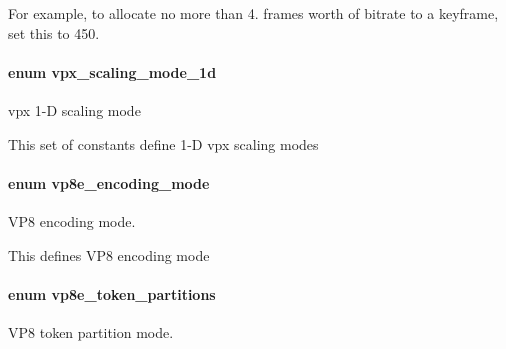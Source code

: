 \begin{Desc}
\begin{description}
\-For example, to allocate no more than 4. frames worth of bitrate to a keyframe, set this to 450. \end{description}
\end{Desc}

\hypertarget{group__vp8__encoder_ga70071b1bb6cac9a1ef0ea3d8362ff94f}{
\paragraph[{vpx\-\_\-scaling\-\_\-mode\-\_\-1d}]{\setlength{\rightskip}{0pt plus 5cm}enum {\bf vpx\-\_\-scaling\-\_\-mode\-\_\-1d}}}
\label{group__vp8__encoder_ga70071b1bb6cac9a1ef0ea3d8362ff94f}


vpx 1-\/\-D scaling mode 

\-This set of constants define 1-\/\-D vpx scaling modes \hypertarget{group__vp8__encoder_ga57a092f46c3afa879c237f775d4f51dd}{
\paragraph[{vp8e\-\_\-encoding\-\_\-mode}]{\setlength{\rightskip}{0pt plus 5cm}enum {\bf vp8e\-\_\-encoding\-\_\-mode}}}
\label{group__vp8__encoder_ga57a092f46c3afa879c237f775d4f51dd}


\-V\-P8 encoding mode. 

\-This defines \-V\-P8 encoding mode \hypertarget{group__vp8__encoder_ga5f7508ba3fb453b47f62313ed0b864d2}{
\paragraph[{vp8e\-\_\-token\-\_\-partitions}]{\setlength{\rightskip}{0pt plus 5cm}enum {\bf vp8e\-\_\-token\-\_\-partitions}}}
\label{group__vp8__encoder_ga5f7508ba3fb453b47f62313ed0b864d2}


\-V\-P8 token partition mode. 

